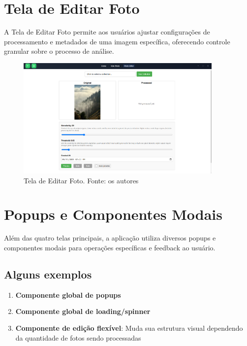 \section{Tela de Editar Foto}

A Tela de Editar Foto permite aos usuários ajustar configurações de processamento e metadados de uma imagem específica, oferecendo controle granular sobre o processo de análise.

\begin{figure}[H]
    \centering
    \includegraphics[width=0.9\textwidth]{../figures/hci/photo_editor.png}
    \caption{Tela de Editar Foto. Fonte: os autores}
    \label{fig:photo-editor}
\end{figure}

\section{Popups e Componentes Modais}

Além das quatro telas principais, a aplicação utiliza diversos popups e componentes modais para operações específicas e feedback ao usuário.

\subsection{Alguns exemplos}

\begin{enumerate}
    \item \textbf{Componente global de popups}
    \item \textbf{Componente global de loading/spinner}
    \item \textbf{Componente de edição flexível}: Muda sua estrutura visual dependendo da quantidade de fotos sendo processadas
\end{enumerate}

